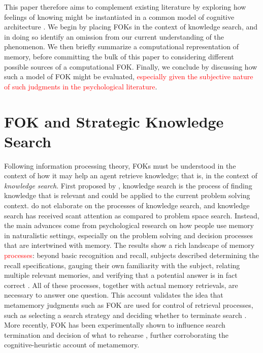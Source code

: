 \documentclass[10pt,letterpaper]{article}
\newcommand{\fixme}[2][]{#2}
\renewcommand{\fixme}[2][]{\textcolor{red}{#2}}
\newcommand{\textcite}[1]{\citeauthor{#1} \citeyear{#1}}
\begin{document}
This paper therefore aims to complement existing literature by exploring how feelings of knowing might be instantiated in a common model of cognitive architecture \cite{Laird2017AStandardModel}.
We begin by placing FOKs in the context of knowledge search, and in doing so identify an omission from our current understanding of the phenomenon.
We then briefly summarize a computational representation of memory, before committing the bulk of this paper to considering different possible sources of a computational FOK.
Finally, we conclude by discussing how such a model of FOK might be evaluated, \fixme{especially given the subjective nature of such judgments in the psychological literature}.

\section{FOK and Strategic Knowledge Search}

Following information processing theory, FOKs must be understood in the context of how it may help an agent retrieve knowledge; that is, in the context of \textit{knowledge search}.
First proposed by \textcite{Newell1972HumanProblemSolving}, knowledge search is the process of finding knowledge that is relevant and could be applied to the current problem solving context.
\citeauthor{Newell1972HumanProblemSolving} do not elaborate on the processes of knowledge search, and knowledge search has received scant attention as compared to problem space search.
Instead, the main advances come from psychological research on how people use memory in naturalistic settings, especially on the problem solving and decision processes that are intertwined with memory.
The results show a rich landscape of memory \fixme[repeated word]{processes}: beyond basic recognition and recall, subjects described determining the recall specifications, gauging their own familiarity with the subject, relating multiple relevant memories, and verifying that a potential answer is in fact correct \cite{Burgess1996ConfabulationAndThe}.
All of these processes, together with actual memory retrievals, are necessary to answer one question.
This account validates the idea that metamemory judgments such as FOK are used for control of retrieval processes, such as selecting a search strategy and deciding whether to terminate search \cite{Nelson1990MetamemoryATheoretical}.
More recently, FOK has been experimentally shown to influence search termination and decision of what to rehearse \cite{Singer2008FeelingOfKnowing,Hanczakowski2014FeelingOfKnowing}, further corroborating the cognitive-heuristic account of metamemory.
\end{document}
